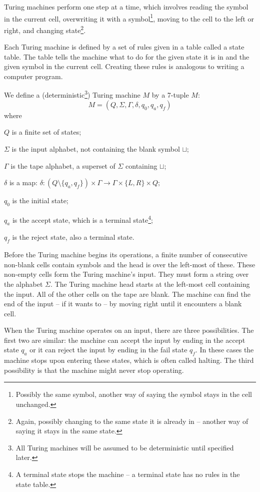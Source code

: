 \documentclass{iansnotes}
\begin{document}
  Turing machines perform one step at a time, which involves reading the symbol in the current cell, overwriting it with a symbol\footnote{Possibly the same symbol, another way of saying the symbol stays in the cell unchanged.}, moving to the cell to the left or right, and changing state\footnote{Again, possibly changing to the same state it is already in -- another way of saying it stays in the same state.}.
  
  Each Turing machine is defined by a set of rules given in a table called a state table.
  The table tells the machine what to do for the given state it is in and the given symbol in the current cell.
  Creating these rules is analogous to writing a computer program.

  We define a (deterministic\footnote{All Turing machines will be assumed to be deterministic until specified later.}) Turing machine \( M \) by a 7-tuple $M$:
  \[ M = ( Q, \Sigma, \Gamma, \delta, q_0, q_a, q_f ) \]
  where
\begin{description}
  \item $Q$ is a finite set of states;
  \item $\Sigma$ is the input alphabet, not containing the blank symbol \( \sqcup \);
  \item $\Gamma$ is the tape alphabet, a superset of \( \Sigma \) containing \( \sqcup \);
  \item $\delta$ is a map: $\delta: (Q \setminus \{ q_a, q_f \}) \times \Gamma \rightarrow \Gamma \times \{ L, R \} \times Q;$
  \item $q_0$ is the initial state;
  \item $q_a$ is the accept state, which is a terminal state\footnote{A terminal state stops the machine -- a terminal state has no rules in the state table.};
  \item $q_f$ is the reject state, also a terminal state.  
\end{description}

  Before the Turing machine begins its operations, a finite number of consecutive non-blank cells contain symbols and the head is over the left-most of these.
  These non-empty cells form the Turing machine's input.
  They must form a string over the alphabet $\Sigma$.
  The Turing machine head starts at the left-most cell containing the input.
  All of the other cells on the tape are blank.
  The machine can find the end of the input -- if it wants to -- by moving right until it encounters a blank cell.

  When the Turing machine operates on an input, there are three possibilities.
  The first two are similar: the machine can accept the input by ending in the accept state $q_a$ or it can reject the input by ending in the fail state $q_f$.
  In these cases the machine stops upon entering these states, which is often called halting.
  The third possibility is that the machine might never stop operating.
\end{document}
